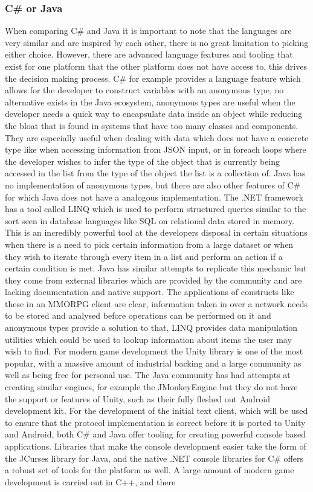 \documentclass{article}
\begin{document}
	\subsubsection{C\# or Java}
	When comparing C\# and Java it is important to note that the languages are very similar and are inspired by each other, there is no great limitation to picking either choice. However, there are advanced language features and tooling that exist for one platform that the other platform does not have access to, this drives the decision making process. C\# for example provides a language feature which allows for the developer to construct variables with an anonymous type, no alternative exists in the Java ecosystem, anonymous types are useful when the developer needs a quick way to encapsulate data inside an object while reducing the bloat that is found in systems that have too many classes and components. They are especially useful when dealing with data which does not have a concrete type like when accessing information from JSON input, or in foreach loops where the developer wishes to infer the type of the object that is currently being accessed in the list from the type of the object the list is a collection of. Java has no implementation of anonymous types, but there are also other features of C\# for which Java does not have a analogous implementation. The .NET framework has a tool called LINQ which is used to perform structured queries similar to the sort seen in database languages like SQL on relational data stored in memory. This is an incredibly powerful tool at the developers disposal in certain situations when there is a need to pick certain information from a large dataset or when they wish to iterate through every item in a list and perform an action if a certain condition is met. Java has similar attempts to replicate this mechanic but they come from external libraries which are provided by the community and are lacking documentation and native support. The applications of constructs like these in an MMORPG client are clear, information taken in over a network needs to be stored and analysed before operations can be performed on it and anonymous types provide a solution to that, LINQ provides data manipulation utilities which could be used to lookup information about items the user may wish to find. For modern game development the Unity library is one of the most popular, with a massive amount of industrial backing and a large community as well as being free for personal use\cite{Unity3D}. The Java community has had attempts at creating similar engines, for example the JMonkeyEngine\cite{JMonkey} but they do not have the support or features of Unity, such as their fully fleshed out Android development kit. For the development of the initial text client, which will be used to ensure that the protocol implementation is correct before it is ported to Unity and Android, both C\# and Java offer tooling for creating powerful console based applications. Libraries that make the console development easier take the form of the JCurses library\cite{JCurses} for Java, and the native .NET console libraries for C\# offers a robust set of tools for the platform as well. A large amount of modern game development is carried out in C++, and there 
\end{document}
